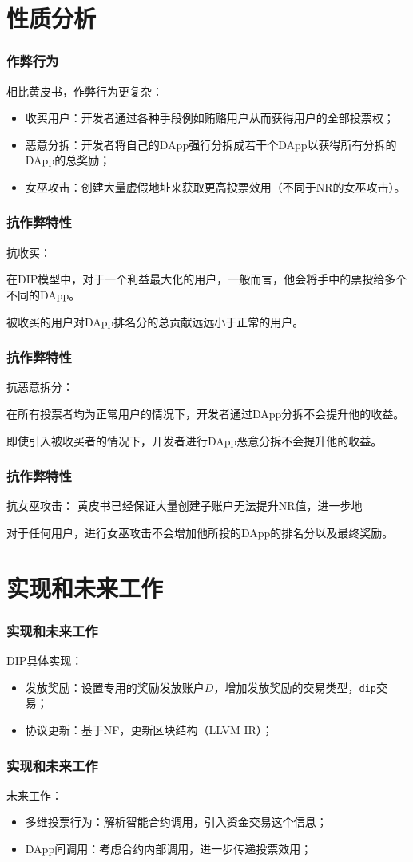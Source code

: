 \section{性质分析}
\begin{frame}\frametitle{作弊行为}
	相比黄皮书，作弊行为更复杂：
\begin{itemize}
\item 收买用户：开发者通过各种手段例如贿赂用户从而获得用户的全部投票权；
\item 恶意分拆：开发者将自己的DApp强行分拆成若干个DApp以获得所有分拆的 DApp的总奖励；
\item 女巫攻击：创建大量虚假地址来获取更高投票效用（不同于NR的女巫攻击）。
\end{itemize}
\end{frame}

\begin{frame}\frametitle{抗作弊特性}
抗收买：
\begin{property}
在DIP模型中，对于一个利益最大化的用户，一般而言，他会将手中的票投给多个不同的DApp。
\end{property}

\begin{corollary}
被收买的用户对DApp排名分的总贡献远远小于正常的用户。
\end{corollary}
\end{frame}

\begin{frame}\frametitle{抗作弊特性}
抗恶意拆分：
\begin{property}
	在所有投票者均为正常用户的情况下，开发者通过DApp分拆不会提升他的收益。
\end{property}

\begin{corollary}
	即使引入被收买者的情况下，开发者进行DApp恶意分拆不会提升他的收益。
\end{corollary}
\end{frame}

\begin{frame}\frametitle{抗作弊特性}
抗女巫攻击：
黄皮书已经保证大量创建子账户无法提升NR值，进一步地

\begin{property}
	\label{p3}
	对于任何用户，进行女巫攻击不会增加他所投的DApp的排名分以及最终奖励。
\end{property}
\end{frame}


\section{实现和未来工作}
\begin{frame}\frametitle{实现和未来工作}
DIP具体实现：
\begin{itemize}
\item 发放奖励：设置专用的奖励发放账户$D$，增加发放奖励的交易类型，\texttt{dip}交易；
\item 协议更新：基于NF，更新区块结构（LLVM IR）；
\end{itemize}
\end{frame}

\begin{frame}\frametitle{实现和未来工作}
未来工作：
\begin{itemize}
\item 多维投票行为：解析智能合约调用，引入资金交易这个信息；
\item DApp间调用：考虑合约内部调用，进一步传递投票效用；
\end{itemize}
\end{frame}